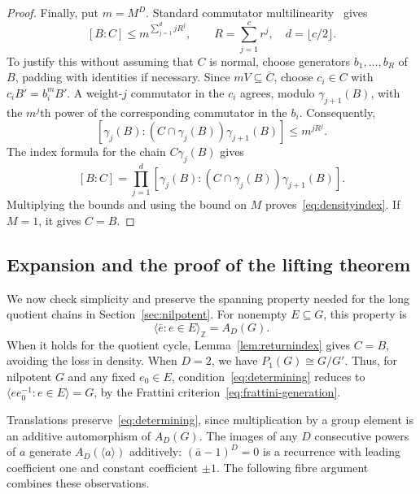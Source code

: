 \documentclass[11pt,a4paper,reqno]{amsart}
\theoremstyle{definition}
\theoremstyle{remark}
\numberwithin{equation}{section}
\newcommand{\Z}{\mathbb Z}
\newcommand{\gen}[1]{\langle #1\rangle}
\newcommand{\spanZ}[1]{\langle #1\rangle_{\Z}}
\begin{document}
\begin{proof}
Finally, put $m=M^D$. Standard commutator multilinearity~\cite[Section 5.2]{Robinson} gives
\[
 [B:C]\le m^{\sum_{j=1}^{d}jR^j},
 \qquad R=\sum_{j=1}^c r^j,\quad d=\lfloor c/2\rfloor.
\]
To justify this without assuming that $C$ is normal, choose generators $b_1,\ldots,b_R$ of $B$, padding with identities if necessary. Since $mV\subseteq\overline C$, choose $c_i\in C$ with $c_iB'=b_i^mB'$. A weight-$j$ commutator in the $c_i$ agrees, modulo $\gamma_{j+1}(B)$, with the $m^j$th power of the corresponding commutator in the $b_i$. Consequently,
\[
 [\gamma_j(B):(C\cap\gamma_j(B))\gamma_{j+1}(B)]
 \le m^{jR^j}.
\]
The index formula for the chain $C\gamma_j(B)$ gives
\[
 [B:C]=\prod_{j=1}^{d}
 [\gamma_j(B):(C\cap\gamma_j(B))\gamma_{j+1}(B)].
\]
Multiplying the bounds and using the bound on $M$ proves~\eqref{eq:densityindex}. If $M=1$, it gives $C=B$.
\end{proof}

\subsection{Expansion and the proof of the lifting theorem}
We now check simplicity and preserve the spanning property needed for the long quotient chains in Section~\ref{sec:nilpotent}. For nonempty $E\subseteq G$, this property is
\begin{equation}\label{eq:determining}
 \spanZ{\bar e:e\in E}=A_D(G).
\end{equation}
When it holds for the quotient cycle, Lemma~\ref{lem:returnindex} gives $C=B$, avoiding the loss in density. When $D=2$, we have $P_1(G)\cong G/G'$. Thus, for nilpotent $G$ and any fixed $e_0\in E$, condition~\eqref{eq:determining} reduces to $\gen{ee_0^{-1}:e\in E}=G$, by the Frattini criterion~\eqref{eq:frattini-generation}.

Translations preserve~\eqref{eq:determining}, since multiplication by a group element is an additive automorphism of $A_D(G)$. The images of any $D$ consecutive powers of $a$ generate $A_D(\gen a)$ additively: $(\bar a-1)^D=0$ is a recurrence with leading coefficient one and constant coefficient $\pm1$. The following fibre argument combines these observations.
\end{document}
